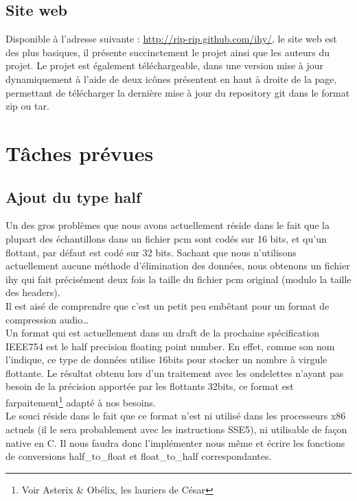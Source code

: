 \documentclass[a4paper,12pt]{article}
\begin{document}
	\subsection{Site web}
Disponible à l'adresse suivante : \url{http://rip-rip.github.com/ihy/}, le site
web est des plus basiques, il présente succinctement le projet ainsi que  les auteurs du
projet. Le projet est également téléchargeable, dans une version mise à jour
dynamiquement à l'aide de deux icônes présentent en haut à droite de la page, permettant
de télécharger la dernière mise à jour du repository git dans le format zip ou tar.

\newpage

\section{Tâches prévues}

	\subsection{Ajout du type half}
Un des gros problèmes que nous avons actuellement réside dans le fait que la
plupart des échantillons dans un fichier pcm sont codés sur 16 bits, et qu'un
flottant, par défaut est codé sur 32 bits. Sachant que nous n'utilisons
actuellement aucune méthode d'élimination des données, nous obtenons un
fichier ihy qui fait précisément deux fois la taille du fichier pcm original
(modulo la taille des headers).\\
Il est aisé de comprendre que c'est un petit peu embêtant pour un format de
compression audio\ldots\\
Un format qui est actuellement dans un draft de la prochaine spécification
IEEE754 est le half precision floating point number. En effet, comme son nom
l'indique, ce type de données utilise 16bits pour stocker un nombre à virgule
flottante. Le résultat obtenu lors d'un traitement avec les ondelettes n'ayant
pas besoin de la précision apportée par les flottants 32bits, ce format est
farpaitement\footnote{Voir Asterix \& Obélix, les lauriers de César} adapté à nos
besoins.\\
Le souci réside dans le fait que ce format n'est ni utilisé dans les processeurs
x86 actuels (il le sera probablement avec les instructions SSE5), ni utilisable
de façon native en C. Il nous faudra donc l'implémenter nous même et écrire les fonctions de
conversions half\_to\_float et float\_to\_half correspondantes.

\newpage
\end{document}
